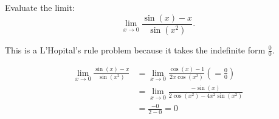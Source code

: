 \documentclass{ximera}
\author{Emma Smith Zbarsky}
\begin{document}
\begin{exercise}

Evaluate the limit: \[\lim_{x\to 0} \frac{\sin(x)-x}{\sin(x^2)}.\]


\begin{hint}
This is a L'Hopital's rule problem because it takes the indefinite form
$\frac{0}{0}$.
\end{hint}


\begin{hint}
\begin{align*}
\lim_{x\to 0} \frac{\sin(x)-x}{\sin(x^2)} &= \lim_{x\to 0} \frac{\cos(x)-1}{2x\cos(x^2)} \left(=\frac{0}{0}\right) \\
&= \lim_{x\to 0} \frac{-\sin(x)}{2\cos(x^2)-4x^2\sin(x^2)} \\
&= \frac{-0}{2-0} = 0 \end{align*}
\end{hint}


\begin{multipleChoice}
\choice{$\infty$}
\choice{$-\infty$}
\end{multipleChoice}

\end{exercise}
\end{document}

